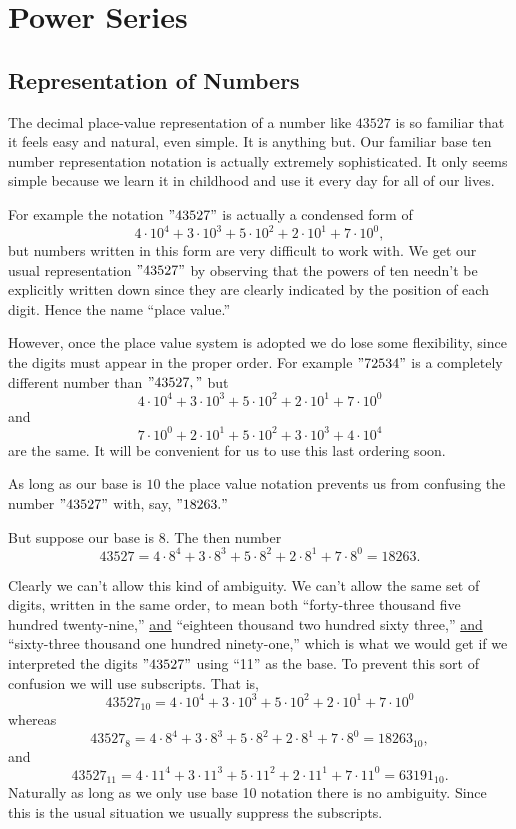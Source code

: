 \chapter{Power Series }
\label{cha:power-series}

\section{Representation of Numbers}
\label{sec:repr-numb}

The decimal place-value representation of a number like $43527$ is so
familiar that it feels easy and natural, even simple. It is anything
but. Our familiar  base ten number representation notation is actually
extremely sophisticated. It only seems simple because we learn it in
childhood and use it every day for  all of our lives. 

For example the notation $"43527"$ is actually a condensed form of
$$
4\cdot10^4+3\cdot10^3+5\cdot10^2+2\cdot10^1+7\cdot10^0,
$$
but numbers written in this form are very difficult to work with. We
get our usual representation $"43527"$ by observing that the powers of
ten needn't be explicitly written down since they are clearly
indicated by the position of each digit. Hence the name ``place
value.'' 

However, once the place value system is adopted we do lose
some flexibility, since the digits  must appear in the proper
order. For example $"72534"$ is a completely different number than
$"43527,"$ but 
$$
4\cdot10^4+3\cdot10^3+5\cdot10^2+2\cdot10^1+7\cdot10^0
$$
and 
$$
7\cdot10^0+2\cdot10^1+5\cdot10^2+3\cdot10^3+4\cdot10^4
$$
are the same. It will be convenient for us to use this last ordering
soon.

As long as our base  is $10$ the place value notation prevents us
from confusing the number $"43527"$ with, say, $"18263."$

But suppose our base is $8.$ The then number 
$$
43527 = 4\cdot8^4+3\cdot8^3+5\cdot8^2+2\cdot8^1+7\cdot8^0 = 18263.
$$

Clearly we can't allow this kind of ambiguity. We can't allow the same
set of digits, written in the same order, to mean both ``forty-three
thousand five hundred twenty-nine,'' \underline{and} ``eighteen
thousand two hundred sixty three,''  \underline{and} ``sixty-three
thousand one hundred ninety-one,'' which is what we would get if we
interpreted the digits $"43527"$ using ``11'' as the base. To prevent
this sort of confusion we will use subscripts. That is, 
$$
43527_{10} = 4\cdot10^4+3\cdot10^3+5\cdot10^2+2\cdot10^1+7\cdot10^0
$$
whereas
$$
43527_{8} = 4\cdot8^4+3\cdot8^3+5\cdot8^2+2\cdot8^1+7\cdot8^0 = 18263_{10}, 
$$
and 
$$
43527_{11} = 4\cdot11^4+3\cdot11^3+5\cdot11^2+2\cdot11^1+7\cdot11^0 = 63191_{10}.
$$
Naturally as long as we only use base 10 notation there is no
ambiguity. Since this is the usual situation we usually suppress the
subscripts.

